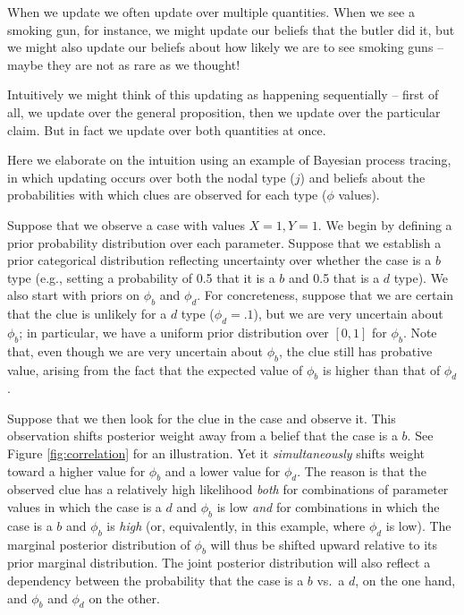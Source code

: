 \documentclass[
  12pt,
]{book}
\begin{document}
When we update we often update over multiple quantities. When we see a smoking gun, for instance, we might update our beliefs that the butler did it, but we might also update our beliefs about how likely we are to see smoking guns -- maybe they are not as rare as we thought!

Intuitively we might think of this updating as happening sequentially -- first of all, we update over the general proposition, then we update over the particular claim. But in fact we update over both quantities at once.

Here we elaborate on the intuition using an example of Bayesian process tracing, in which updating occurs over both the nodal type (\(j\)) and beliefs about the probabilities with which clues are observed for each type (\(\phi\) values).

Suppose that we observe a case with values \(X=1, Y=1\). We begin by defining a prior probability distribution over each parameter. Suppose that we establish a prior categorical distribution reflecting uncertainty over whether the case is a \(b\) type (e.g., setting a probability of 0.5 that it is a \(b\) and 0.5 that is a \(d\) type). We also start with priors on \(\phi_b\) and \(\phi_d\). For concreteness, suppose that we are certain that the clue is unlikely for a \(d\) type (\(\phi_d=.1\)), but we are very uncertain about \(\phi_b\); in particular, we have a uniform prior distribution over \([0,1]\) for \(\phi_b\). Note that, even though we are very uncertain about \(\phi_b\), the clue still has probative value, arising from the fact that the expected value of \(\phi_b\) is higher than that of \(\phi_d\).

Suppose that we then look for the clue in the case and observe it. This observation shifts posterior weight away from a belief that the case is a \(b\). See Figure \ref{fig:correlation} for an illustration. Yet it \emph{simultaneously} shifts weight toward a higher value for \(\phi_b\) and a lower value for \(\phi_d\). The reason is that the observed clue has a relatively high likelihood \emph{both} for combinations of parameter values in which the case is a \(d\) and \(\phi_b\) is low \emph{and} for combinations in which the case is a \(b\) and \(\phi_b\) is \emph{high} (or, equivalently, in this example, where \(\phi_d\) is low). The marginal posterior distribution of \(\phi_b\) will thus be shifted upward relative to its prior marginal distribution. The joint posterior distribution will also reflect a dependency between the probability that the case is a \(b\) vs.~a \(d\), on the one hand, and \(\phi_b\) and \(\phi_d\) on the other.
\end{document}
